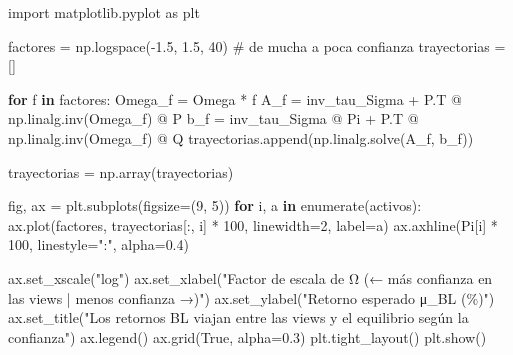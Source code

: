\documentclass[
  spanish,
  letterpaper,
  DIV=11,
  numbers=noendperiod]{scrreprt}
\newenvironment{Shaded}{\begin{snugshade}}{\end{snugshade}}
\newcommand{\BuiltInTok}[1]{\textcolor[rgb]{0.00,0.23,0.31}{#1}}
\newcommand{\CommentTok}[1]{\textcolor[rgb]{0.37,0.37,0.37}{#1}}
\newcommand{\ControlFlowTok}[1]{\textcolor[rgb]{0.00,0.23,0.31}{\textbf{#1}}}
\newcommand{\DecValTok}[1]{\textcolor[rgb]{0.68,0.00,0.00}{#1}}
\newcommand{\FloatTok}[1]{\textcolor[rgb]{0.68,0.00,0.00}{#1}}
\newcommand{\ImportTok}[1]{\textcolor[rgb]{0.00,0.46,0.62}{#1}}
\newcommand{\KeywordTok}[1]{\textcolor[rgb]{0.00,0.23,0.31}{\textbf{#1}}}
\newcommand{\NormalTok}[1]{\textcolor[rgb]{0.00,0.23,0.31}{#1}}
\newcommand{\OperatorTok}[1]{\textcolor[rgb]{0.37,0.37,0.37}{#1}}
\newcommand{\StringTok}[1]{\textcolor[rgb]{0.13,0.47,0.30}{#1}}
\newcommand{\VariableTok}[1]{\textcolor[rgb]{0.07,0.07,0.07}{#1}}
\begin{document}
\begin{Shaded}
\begin{Highlighting}[]
\ImportTok{import}\NormalTok{ matplotlib.pyplot }\ImportTok{as}\NormalTok{ plt}

\NormalTok{factores }\OperatorTok{=}\NormalTok{ np.logspace(}\OperatorTok{{-}}\FloatTok{1.5}\NormalTok{, }\FloatTok{1.5}\NormalTok{, }\DecValTok{40}\NormalTok{)   }\CommentTok{\# de mucha a poca confianza}
\NormalTok{trayectorias }\OperatorTok{=}\NormalTok{ []}

\ControlFlowTok{for}\NormalTok{ f }\KeywordTok{in}\NormalTok{ factores:}
\NormalTok{    Omega\_f }\OperatorTok{=}\NormalTok{ Omega }\OperatorTok{*}\NormalTok{ f}
\NormalTok{    A\_f }\OperatorTok{=}\NormalTok{ inv\_tau\_Sigma }\OperatorTok{+}\NormalTok{ P.T }\OperatorTok{@}\NormalTok{ np.linalg.inv(Omega\_f) }\OperatorTok{@}\NormalTok{ P}
\NormalTok{    b\_f }\OperatorTok{=}\NormalTok{ inv\_tau\_Sigma }\OperatorTok{@}\NormalTok{ Pi }\OperatorTok{+}\NormalTok{ P.T }\OperatorTok{@}\NormalTok{ np.linalg.inv(Omega\_f) }\OperatorTok{@}\NormalTok{ Q}
\NormalTok{    trayectorias.append(np.linalg.solve(A\_f, b\_f))}

\NormalTok{trayectorias }\OperatorTok{=}\NormalTok{ np.array(trayectorias)}

\NormalTok{fig, ax }\OperatorTok{=}\NormalTok{ plt.subplots(figsize}\OperatorTok{=}\NormalTok{(}\DecValTok{9}\NormalTok{, }\DecValTok{5}\NormalTok{))}
\ControlFlowTok{for}\NormalTok{ i, a }\KeywordTok{in} \BuiltInTok{enumerate}\NormalTok{(activos):}
\NormalTok{    ax.plot(factores, trayectorias[:, i] }\OperatorTok{*} \DecValTok{100}\NormalTok{, linewidth}\OperatorTok{=}\DecValTok{2}\NormalTok{, label}\OperatorTok{=}\NormalTok{a)}
\NormalTok{    ax.axhline(Pi[i] }\OperatorTok{*} \DecValTok{100}\NormalTok{, linestyle}\OperatorTok{=}\StringTok{":"}\NormalTok{, alpha}\OperatorTok{=}\FloatTok{0.4}\NormalTok{)}

\NormalTok{ax.set\_xscale(}\StringTok{"log"}\NormalTok{)}
\NormalTok{ax.set\_xlabel(}\StringTok{"Factor de escala de Ω  (← más confianza en las views | menos confianza →)"}\NormalTok{)}
\NormalTok{ax.set\_ylabel(}\StringTok{"Retorno esperado μ\_BL (\%)"}\NormalTok{)}
\NormalTok{ax.set\_title(}\StringTok{"Los retornos BL viajan entre las views y el equilibrio según la confianza"}\NormalTok{)}
\NormalTok{ax.legend()}
\NormalTok{ax.grid(}\VariableTok{True}\NormalTok{, alpha}\OperatorTok{=}\FloatTok{0.3}\NormalTok{)}
\NormalTok{plt.tight\_layout()}
\NormalTok{plt.show()}
\end{Highlighting}
\end{Shaded}
\end{document}
